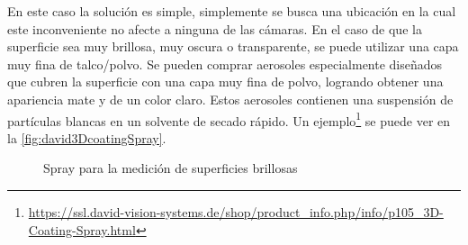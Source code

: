 En este caso la solución es simple, simplemente se busca una ubicación en la cual este inconveniente no afecte a ninguna de las cámaras. En el caso de que la superficie sea muy brillosa, muy oscura o transparente, se puede utilizar una capa muy fina de talco/polvo. Se pueden comprar aerosoles especialmente diseñados que cubren la superficie con una capa muy fina de polvo, logrando obtener una apariencia mate y de un color claro. Estos aerosoles contienen una suspensión de partículas blancas en un solvente de secado rápido. Un ejemplo\footnote{\url{https://ssl.david-vision-systems.de/shop/product_info.php/info/p105_3D-Coating-Spray.html}} se puede ver en la \autoref{fig:david3DcoatingSpray}.

\begin{figure}[!bth]
    \myfloatalign
        \caption{Spray para la medición de superficies brillosas}
        \label{fig:david3DcoatingSpray}
\end{figure}